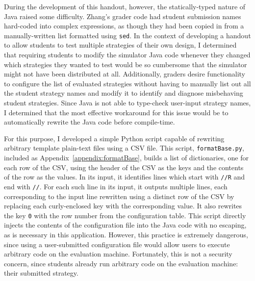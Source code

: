 \documentclass[pageno]{jpaper}
\begin{document}
During the development of this handout, however, the statically-typed nature of Java raised some difficulty.
Zhang's grader code had student submission names hard-coded into complex expressions, as though they had been copied in from a manually-written list formatted using \texttt{sed}.
In the context of developing a handout to allow students to test multiple strategies of their own design, I determined that requiring students to modify the simulator Java code whenever they changed which strategies they wanted to test would be so cumbersome that the simulator might not have been distributed at all.
Additionally, graders desire functionality to configure the list of evaluated strategies without having to manually list out all the student strategy names and modify it to identify and diagnose misbehaving student strategies.
Since Java is not able to type-check user-input strategy names, I determined that the most effective workaround for this issue would be to automatically rewrite the Java code before compile-time.

For this purpose, I developed a simple Python script capable of rewriting arbitrary template plain-text files using a CSV file.
This script, \texttt{formatBase.py}, included as Appendix~\ref{appendix:formatBase}, builds a list of dictionaries, one for each row of the CSV, using the header of the CSV as the keys and the contents of the row as the values.
In its input, it identifies lines which start with \texttt{//R} and end with \texttt{//}.
For each such line in its input, it outputs multiple lines, each corresponding to the input line rewritten using a distinct row of the CSV by replacing each curly-enclosed key with the corresponding value.
It also rewrites the key \texttt{0} with the row number from the configuration table.
This script directly injects the contents of the configuration file into the Java code with no escaping, as is necessary in this application.
However, this practice is extremely dangerous, since using a user-submitted configuration file would allow users to execute arbitrary code on the evaluation machine.
Fortunately, this is not a security concern, since students already run arbitrary code on the evaluation machine: their submitted strategy.
\end{document}

